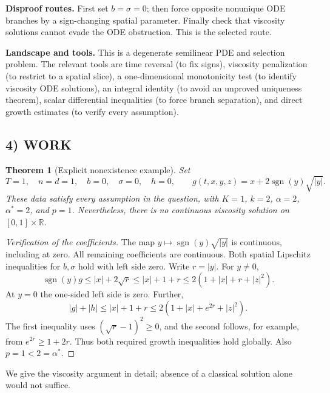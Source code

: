 \documentclass[11pt,a4paper]{article}
\newcommand{\R}{\mathbb R}
\newcommand{\sgn}{\operatorname{sgn}}
\newtheorem{theorem}{Theorem}
\theoremstyle{definition}
\begin{document}
\textbf{Disproof routes.} First set $b=\sigma=0$; then force opposite nonunique ODE branches by a sign-changing spatial parameter. Finally check that viscosity solutions cannot evade the ODE obstruction. This is the selected route.

\textbf{Landscape and tools.} This is a degenerate semilinear PDE and selection problem. The relevant tools are time reversal (to fix signs), viscosity penalization (to restrict to a spatial slice), a one-dimensional monotonicity test (to identify viscosity ODE solutions), an integral identity (to avoid an unproved uniqueness theorem), scalar differential inequalities (to force branch separation), and direct growth estimates (to verify every assumption).

\subsection*{4) WORK}
\begin{theorem}[Explicit nonexistence example]
Set
\[
 T=1,\quad n=d=1,\quad b=0,\quad\sigma=0,\quad h=0,
 \qquad g(t,x,y,z)=x+2\sgn(y)\sqrt{|y|}.
\]
These data satisfy every assumption in the question, with
$K=1$, $k=2$, $\alpha=2$, $\alpha^*=2$, and $p=1$.
Nevertheless, there is no continuous viscosity solution on $[0,1]\times\R$.
\end{theorem}
\begin{proof}[Verification of the coefficients]
The map $y\mapsto\sgn(y)\sqrt{|y|}$ is continuous, including at zero. All remaining coefficients are continuous. Both spatial Lipschitz inequalities for $b,\sigma$ hold with left side zero. Write $r=|y|$. For $y\ne0$,
\[
 \sgn(y)g\le |x|+2\sqrt r\le |x|+1+r
       \le2(1+|x|+r+|z|^2).
\]
At $y=0$ the one-sided left side is zero. Further,
\[
 |g|+|h|\le |x|+1+r
       \le2(1+|x|+e^{2r}+|z|^2).
\]
The first inequality uses $(\sqrt r-1)^2\ge0$, and the second follows, for example, from $e^{2r}\ge1+2r$. Thus both required growth inequalities hold globally. Also $p=1<2=\alpha^*$.
\end{proof}

We give the viscosity argument in detail; absence of a classical solution alone would not suffice.
\end{document}
